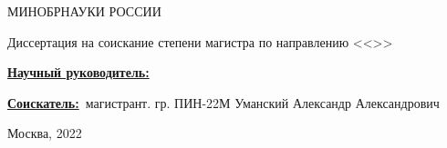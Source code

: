 \begin{frame}
    \begin{center}
        МИНОБРНАУКИ РОССИИ \\
        \thesisOrganization

        \justify{\textbf{\large \thesisTitle}}
        \newline

        Диссертация на соискание степени магистра по направлению \thesisSpecialtyNumber <<\thesisSpecialtyTitle>>

    \end{center}

    \underline{\textbf{Научный руководитель:}}~\supervisorRegaliaShort~\supervisorFio

    \underline{\textbf{Соискатель:}}~магистрант. гр. ПИН-22М Уманский Александр Александрович

    \begin{center}
        Москва, 2022
    \end{center}

\end{frame}
